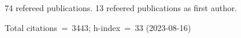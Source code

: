 74 refereed publications. 13 refeered publications as first author.

Total citations~=~3443; h-index~=~33 (2023-08-16)